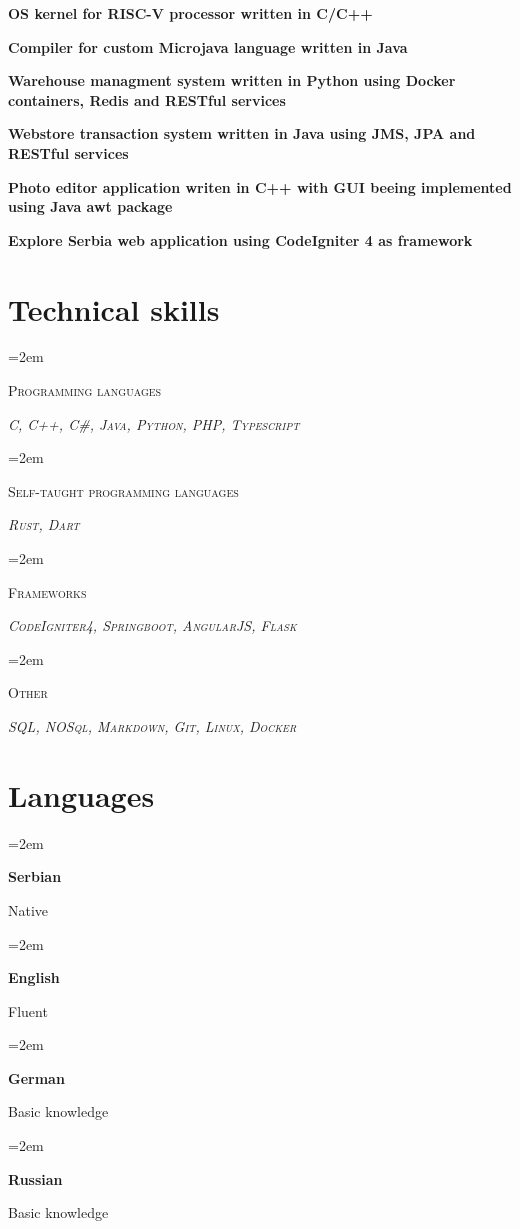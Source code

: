 \documentclass[12pt]{article}
\newlength{\spacebox}
\newcommand{\sepspace}{\vspace*{1em}}
\newcommand{\skill}[2]{
  \noindent\hangindent=2em\hangafter=0
  \parbox{3\spacebox}{%
    \textsc{#1}} %
  \textsl{#2} \par} %
\newcommand{\lan}[2]{
    \noindent\hangindent=2em\hangafter=0
    \parbox{\spacebox}{%
        \textbf{#1}} %
     #2 \par}    %
\newcommand{\project}[1]{

  \noindent  \textbf{#1}
  
\normalsize \par}
\begin{document}
\project{OS kernel for RISC-V processor written in C/C++}

\project{Compiler for custom Microjava language written in Java}

\project{Warehouse managment system written in Python using Docker containers, Redis and RESTful services}

\project{Webstore transaction system written in Java using JMS, JPA and RESTful services}

\project{Photo editor application writen in C++ with GUI beeing implemented using Java awt package}

\project{Explore Serbia web application using CodeIgniter 4 as framework}


\sepspace

\section*{Technical skills}

\skill{Programming languages}{
  \textsc{C}, \textsc{C++}, \textsc{C\#}, \textsc{Java}, \textsc{Python}, \textsc{PHP}, \textsc{Typescript}}
\skill{Self-taught programming languages}{
  \textsc{Rust}, \textsc{Dart}}
\skill{Frameworks}{
  \textsc{CodeIgniter4}, \textsc{Springboot}, \textsc{AngularJS}, \textsc{Flask}}
\skill{Other}{
  \textsc{SQL, NOSql, Markdown, Git, Linux, Docker}}


\section*{Languages}
\lan{Serbian}{Native}
\lan{English}{Fluent}
\lan{German}{Basic knowledge}
\lan{Russian}{Basic knowledge}
\end{document}

